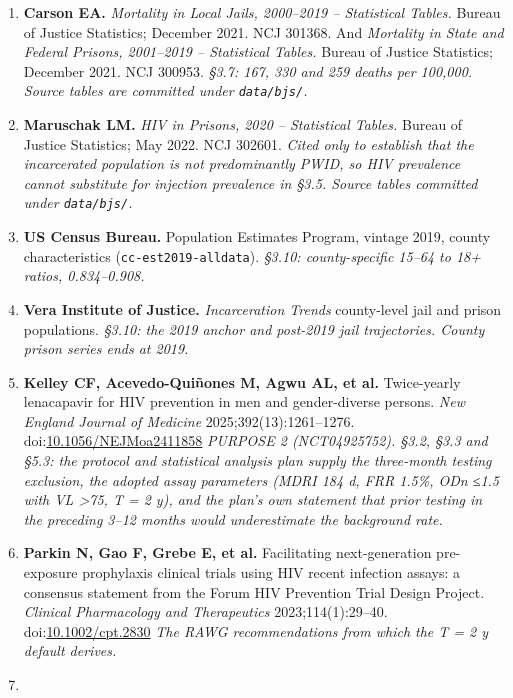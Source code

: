 \begin{enumerate}
\def\labelenumi{\arabic{enumi}.}
\setcounter{enumi}{21}
\item
  \textbf{Carson EA.} \emph{Mortality in Local Jails, 2000--2019 -- Statistical Tables.} Bureau of Justice Statistics; December 2021. NCJ 301368. And \emph{Mortality in State and Federal Prisons, 2001--2019 -- Statistical Tables.} Bureau of Justice Statistics; December 2021. NCJ 300953. \emph{§3.7: 167, 330 and 259 deaths per 100,000. Source tables are committed under \texttt{data/bjs/}.}
\item
  \textbf{Maruschak LM.} \emph{HIV in Prisons, 2020 -- Statistical Tables.} Bureau of Justice Statistics; May 2022. NCJ 302601. \emph{Cited only to establish that the incarcerated population is not predominantly PWID, so HIV prevalence cannot substitute for injection prevalence in §3.5. Source tables committed under \texttt{data/bjs/}.}
\item
  \textbf{US Census Bureau.} Population Estimates Program, vintage 2019, county characteristics (\texttt{cc-est2019-alldata}). \emph{§3.10: county-specific 15--64 to 18+ ratios, 0.834--0.908.}
\item
  \textbf{Vera Institute of Justice.} \emph{Incarceration Trends} county-level jail and prison populations. \emph{§3.10: the 2019 anchor and post-2019 jail trajectories. County prison series ends at 2019.}
\item
  \textbf{Kelley CF, Acevedo-Quiñones M, Agwu AL, et al.} Twice-yearly lenacapavir for HIV prevention in men and gender-diverse persons. \emph{New England Journal of Medicine} 2025;392(13):1261--1276. doi:\href{https://doi.org/10.1056/NEJMoa2411858}{10.1056/NEJMoa2411858}
  \emph{PURPOSE 2 (NCT04925752). §3.2, §3.3 and §5.3: the protocol and statistical analysis plan supply the three-month testing exclusion, the adopted assay parameters (MDRI 184 d, FRR 1.5\%, ODn ≤1.5 with VL \textgreater75, T = 2 y), and the plan's own statement that prior testing in the preceding 3--12 months would underestimate the background rate.}
\item
  \textbf{Parkin N, Gao F, Grebe E, et al.} Facilitating next-generation pre-exposure prophylaxis clinical trials using HIV recent infection assays: a consensus statement from the Forum HIV Prevention Trial Design Project. \emph{Clinical Pharmacology and Therapeutics} 2023;114(1):29--40. doi:\href{https://doi.org/10.1002/cpt.2830}{10.1002/cpt.2830}
  \emph{The RAWG recommendations from which the T = 2 y default derives.}
\item

\end{enumerate}
